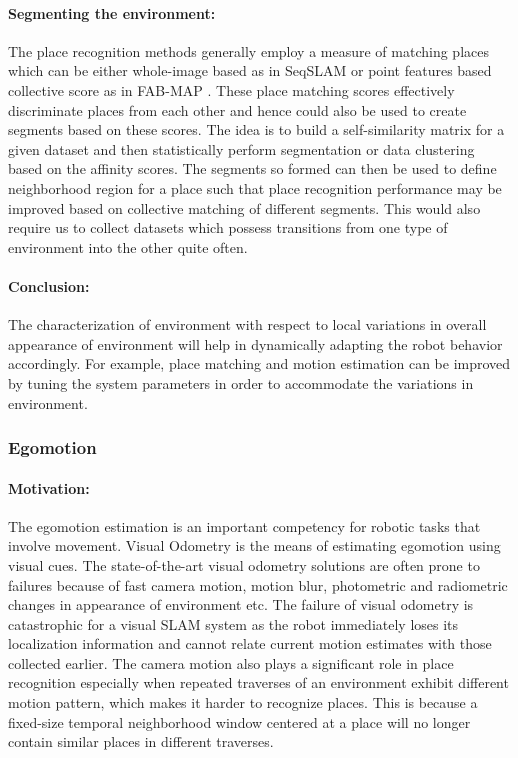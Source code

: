 \documentclass{article}
\begin{document}
\paragraph{Segmenting the environment:}The place recognition methods generally employ a measure of matching places which can be either whole-image based as in SeqSLAM \cite{Milford2012} or point features based collective score as in FAB-MAP \cite{Cummins2009}. These place matching scores effectively discriminate places from each other and hence could also be used to create segments based on these scores. The idea is to build a self-similarity matrix for a given dataset and then statistically perform segmentation or data clustering based on the affinity scores. The segments so formed can then be used to define neighborhood region for a place such that place recognition performance may be improved based on collective matching of different segments. This would also require us to collect datasets which possess transitions from one type of environment into the other quite often.

\paragraph{Conclusion:}The characterization of environment with respect to local variations in overall appearance of environment will help in dynamically adapting the robot behavior accordingly. For example, place matching and motion estimation can be improved by tuning the system parameters in order to accommodate the variations in environment.

\subsubsection{Egomotion}
\paragraph{Motivation:}The egomotion estimation is an important competency for robotic tasks that involve movement. Visual Odometry is the means of estimating egomotion using visual cues. The state-of-the-art visual odometry solutions are often prone to failures because of fast camera motion, motion blur, photometric and radiometric changes in appearance of environment etc. The failure of visual odometry is catastrophic for a visual SLAM system as the robot immediately loses its localization information and cannot relate current motion estimates with those collected earlier. The camera motion also plays a significant role in place recognition especially when repeated traverses of an environment exhibit different motion pattern, which makes it harder to recognize places. This is because a fixed-size temporal neighborhood window centered at a place will no longer contain similar places in different traverses.
\end{document}
